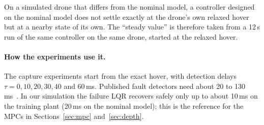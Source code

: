 On a simulated drone that differs from the nominal model, a controller designed on the nominal model does not settle exactly at the drone's own relaxed hover but at a nearby state of its own. The ``steady value'' is therefore taken from a 12\,s run of the same controller on the same drone, started at the relaxed hover.

\paragraph{How the experiments use it.} The capture experiments start from the exact hover, with detection delays $\tau = 0, 10, 20, 30, 40$ and 60\,ms. Published fault detectors need about 20 to 130\,ms~\cite{strack2021fast,yang2026mml1,zhou2025rotorfailureaware}. In our simulation the failure LQR recovers safely only up to about 10\,ms on the training plant (20\,ms on the nominal model); this is the reference for the MPCs in Sections~\ref{sec:mpc} and~\ref{sec:depth}.
